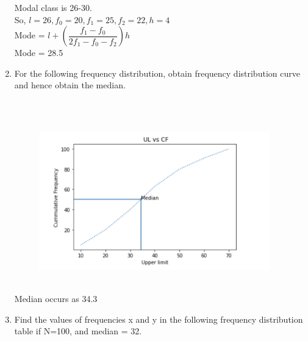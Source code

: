 \documentclass[journal,12pt,twocolumn]{IEEEtran}
\renewcommand\thesection{\arabic{section}}
\begin{document}
\begin{enumerate}[label=\thesection.\arabic*.,ref=\thesection.\theenumi]
Modal class is 26-30.\\
So, $l=26,f_0 = 20, f_1 = 25, f_2 = 22, h = 4$ \\
Mode = $l+(\dfrac{f_1 - f_0}{2f_1-f_0-f_2}) h$ \\
Mode = 28.5\\
\item For the following frequency distribution, obtain frequency distribution curve and hence obtain the median.\\
\begin{table}[ht]
 \centering
 \caption{}
 \end{table} \\
\solution \\
\begin{figure}[h]
\includegraphics[width= 100mm]{hi}
\end{figure}\\
Median occurs as 34.3 \\
\item Find the values of frequencies x and y in the following frequency distribution table if N=100, and median = 32.\\
\begin{table}[ht]
 \centering

\end{table}
\end{enumerate}
\end{document}
